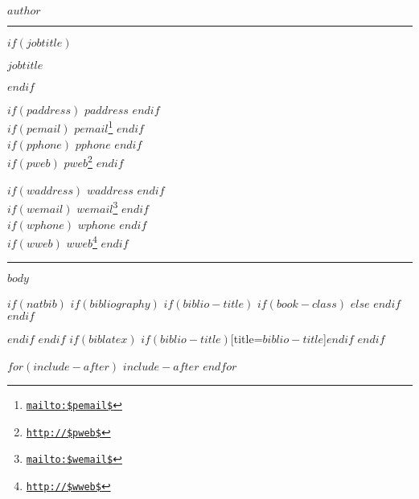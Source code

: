 \documentclass[$if(fontsize)$$fontsize$,$endif$$if(lang)$$babel-lang$,$endif$$if(papersize)$$papersize$paper,$endif$$for(classoption)$$classoption$$sep$,$endfor$]{$documentclass$}
\renewcommand{\href}[2]{#2\footnote{\url{#1}}}
\begin{document}
\thispagestyle{firstpage} %
\pagestyle{regular} %

\centerline{\huge \sffamily \bfseries $author$}

\vspace{2mm}
\hrule
\vspace{2mm}

$if(jobtitle)$
\centerline{$jobtitle$}
$endif$

\begin{multicols}{2}
\noindent %
$if(paddress)$
\faMapMarker \hspace{1 mm} $paddress$
$endif$\\
$if(pemail)$
\faEnvelopeO \hspace{1 mm} \texttt{\href{mailto:$pemail$}{$pemail$}}
$endif$\\
$if(pphone)$
\faPhone \hspace{1 mm} $pphone$
$endif$\\
$if(pweb)$
\faGlobe \hspace{1 mm} \texttt{\href{http://$pweb$}{$pweb$}}
$endif$

\columnbreak %

$if(waddress)$
\faMapMarker \hspace{1 mm} $waddress$
$endif$\\
$if(wemail)$
\faEnvelopeO \hspace{1 mm} \texttt{\href{mailto:$wemail$}{$wemail$}}
$endif$\\
$if(wphone)$
\faPhone \hspace{1 mm} $wphone$
$endif$\\
$if(wweb)$
\faGlobe \hspace{1 mm} \texttt{\href{http://$wweb$}{$wweb$}}
$endif$
\end{multicols}

\vspace{2mm}
\hrule

$body$

$if(natbib)$
$if(bibliography)$
$if(biblio-title)$
$if(book-class)$
\renewcommand\bibname{$biblio-title$}
$else$
\renewcommand\refname{$biblio-title$}
$endif$
$endif$

$endif$
$endif$
$if(biblatex)$
\printbibliography$if(biblio-title)$[title=$biblio-title$]$endif$
$endif$

$for(include-after)$
$include-after$
$endfor$
\end{document}
